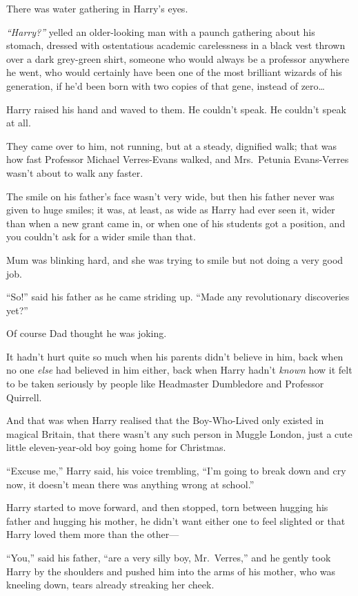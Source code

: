 There was water gathering in Harry's eyes.

\emph{``Harry?''} yelled an older-looking man with a paunch gathering
about his stomach, dressed with ostentatious academic carelessness in a
black vest thrown over a dark grey-green shirt, someone who would always
be a professor anywhere he went, who would certainly have been one of
the most brilliant wizards of his generation, if he'd been born with two
copies of that gene, instead of zero\ldots{}

Harry raised his hand and waved to them. He couldn't speak. He couldn't
speak at all.

They came over to him, not running, but at a steady, dignified walk;
that was how fast Professor Michael Verres-Evans walked, and
Mrs.~Petunia Evans-Verres wasn't about to walk any faster.

The smile on his father's face wasn't very wide, but then his father
never was given to huge smiles; it was, at least, as wide as Harry had
ever seen it, wider than when a new grant came in, or when one of his
students got a position, and you couldn't ask for a wider smile than
that.

Mum was blinking hard, and she was trying to smile but not doing a very
good job.

``So!'' said his father as he came striding up. ``Made any revolutionary
discoveries yet?''

Of course Dad thought he was joking.

It hadn't hurt quite so much when his parents didn't believe in him,
back when no one \emph{else} had believed in him either, back when Harry
hadn't \emph{known} how it felt to be taken seriously by people like
Headmaster Dumbledore and Professor Quirrell.

And that was when Harry realised that the Boy-Who-Lived only existed in
magical Britain, that there wasn't any such person in Muggle London,
just a cute little eleven-year-old boy going home for Christmas.

``Excuse me,'' Harry said, his voice trembling, ``I'm going to break
down and cry now, it doesn't mean there was anything wrong at school.''

Harry started to move forward, and then stopped, torn between hugging
his father and hugging his mother, he didn't want either one to feel
slighted or that Harry loved them more than the other---

``You,'' said his father, ``are a very silly boy, Mr.~Verres,'' and he
gently took Harry by the shoulders and pushed him into the arms of his
mother, who was kneeling down, tears already streaking her cheek.

